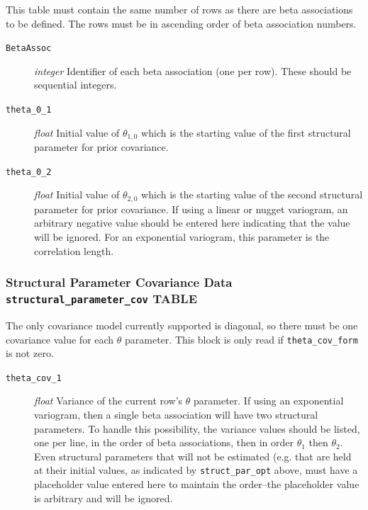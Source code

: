 \documentclass[11pt,oneside,onecolumn]{usgsreport}
\begin{document}
\begin{appendix}
This table must contain the same number of rows as there are beta
associations to be defined. The rows must be in ascending order of
beta association numbers.
\begin{description}
\item [{\texttt{BetaAssoc}}] \emph{integer }Identifier of each beta association
(one per row). These should be sequential integers.
\item [{\texttt{theta\_0\_1}}] \emph{float }Initial value of $\theta_{1,0}$
which is the starting value of the first structural parameter for
prior covariance.
\item [{\texttt{theta\_0\_2}}] \emph{float }Initial value of $\theta_{2,0}$
which is the starting value of the second structural parameter for
prior covariance. If using a linear or nugget variogram, an arbitrary
negative value should be entered here indicating that the value will
be ignored. For an exponential variogram, this parameter is the correlation
length.
\end{description}

\subsubsection{Structural Parameter Covariance Data \texttt{structural\_parameter\_cov}
TABLE}

The only covariance model currently supported is diagonal, so there
must be one covariance value for each $\theta$ parameter. This block
is only read if \texttt{theta\_cov\_form} is not zero.
\begin{description}
\item [{\texttt{theta\_cov\_1}}] \emph{float }Variance of the current row's
$\theta$ parameter. If using an exponential variogram, then a single
beta association will have two structural parameters. To handle this
possibility, the variance values should be listed, one per line, in
the order of beta associations, then in order $\theta_{1}$ then $\theta_{2}$.
Even structural parameters that will not be estimated (e.g. that are
held at their initial values, as indicated by \texttt{struct\_par\_opt}
above, must have a placeholder value entered here to maintain the
order--the placeholder value is arbitrary and will be ignored. 
\end{description}


\end{appendix}
\end{document}
